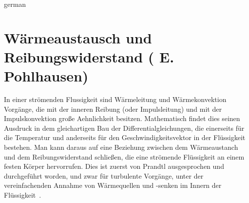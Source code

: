 \documentclass[colorlinks,upint,subscriptcorrection,varvw,hyphenate,balance,greek,russian,vietnamese,german]{asmeconf} %
\begin{document}
\begin{selectlanguage}{german}%
\section{Wärmeaustausch und Reibungswiderstand ( E. Pohlhausen)}\label{app:pohlhausen}
In einer strömenden Flussigkeit sind Wärmeleitung und Wärmekonvektion Vorgänge, die mit der inneren Reibung (oder Impulsleitung) und mit der Impulskonvektion große Aehnlichkeit besitzen. Mathematisch findet dies seinen Ausdruck in dem gleichartigen Bau der Differentialgleichungen, die einerseits für die Temperatur und anderseits für den Geschwindigkeitsvektor in der Flüssigkeit bestehen. Man kann daraus auf eine Beziehung
zwischen dem Wärmeaustanch und dem Reibungswiderstand schließen, die eine strömende Flüssigkeit an einem festen Körper hervorrufen. Dies ist zuerst von Prandtl ausgesprochen und durchgeführt worden, und zwar für turbulente Vorgänge, unter der vereinfachenden Annahme von Wärmequellen und -senken im Innern der Flüssigkeit~\cite{pohlhausen1921}. 
\end{selectlanguage}%


%
 
\end{document}
